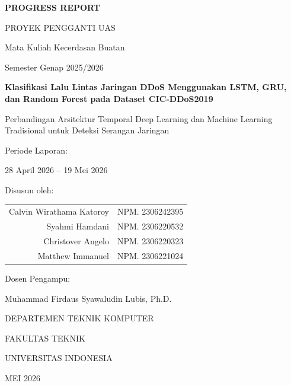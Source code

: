 \documentclass[11pt,a4paper,oneside]{report}
\begin{document}
\begin{titlepage}
\centering
\vspace*{1cm}

{\Large\bfseries PROGRESS REPORT \par}
{\large PROYEK PENGGANTI UAS \par}
\vspace{0.3cm}
{\large Mata Kuliah Kecerdasan Buatan \par}
{\large Semester Genap 2025/2026 \par}

\vspace{2cm}

\vspace{1.5cm}

{\LARGE\bfseries Klasifikasi Lalu Lintas Jaringan DDoS Menggunakan LSTM, GRU, dan Random Forest pada Dataset CIC-DDoS2019 \par}
\vspace{0.5cm}
{\large Perbandingan Arsitektur Temporal Deep Learning dan Machine Learning Tradisional untuk Deteksi Serangan Jaringan \par}

\vspace{2cm}

{\large Periode Laporan: \par}
{\large 28 April 2026 -- 19 Mei 2026 \par}

\vspace{1cm}

{\large Disusun oleh: \par}
\vspace{0.5cm}
\begin{tabular}{rl}
Calvin Wirathama Katoroy & NPM. 2306242395 \\
Syahmi Hamdani           & NPM. 2306220532 \\
Christover Angelo        & NPM. 2306220323 \\
Matthew Immanuel         & NPM. 2306221024 \\
\end{tabular}

\vspace{1.5cm}

{\large Dosen Pengampu: \par}
{\large Muhammad Firdaus Syawaludin Lubis, Ph.D. \par}

\vfill

{\large DEPARTEMEN TEKNIK KOMPUTER \par}
{\large FAKULTAS TEKNIK \par}
{\large UNIVERSITAS INDONESIA \par}
{\large MEI 2026 \par}
\end{titlepage}
\end{document}
